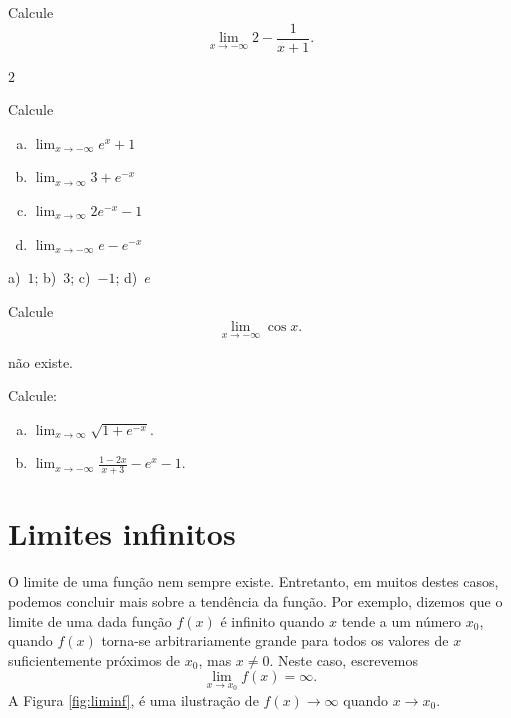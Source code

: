 \begin{exer}
  Calcule
  \begin{equation}
    \lim_{x\to -\infty} 2 - \frac{1}{x+1}.
  \end{equation}
\end{exer}
\begin{resp}
  $2$
\end{resp}

\begin{exer}
  Calcule
\end{exer}
\begin{enumerate}[a)]
\item $\displaystyle \lim_{x\to -\infty} e^x+1$
\item $\displaystyle \lim_{x\to \infty} 3 + e^{-x}$
\item $\displaystyle \lim_{x\to \infty} 2e^{-x}-1$
\item $\displaystyle \lim_{x\to -\infty} e-e^{-x}$
\end{enumerate}
\begin{resp}
  a)~$1$; b)~$3$; c)~$-1$; d)~$e$
\end{resp}

\begin{exer}
  Calcule
  \begin{equation}
    \lim_{x\to -\infty} \cos x.
  \end{equation}
\end{exer}
\begin{resp}
  não existe.
\end{resp}

\begin{exer}
  Calcule:
  \begin{enumerate}[a)]
  \item $\displaystyle\lim_{x\to \infty} \sqrt{1+e^{-x}}$.
  \item $\displaystyle\lim_{x\to -\infty} \frac{1-2x}{x+3} -e^{x} - 1$.
  \end{enumerate}
\end{exer}

\section{Limites infinitos}\label{cap_lim_sec_lim_inf}

O limite de uma função nem sempre existe. Entretanto, em muitos destes casos, podemos concluir mais sobre a tendência da função. Por exemplo, dizemos que o limite de uma dada função $f(x)$ é infinito quando $x$ tende a um número $x_0$, quando $f(x)$ torna-se arbitrariamente grande para todos os valores de $x$ suficientemente próximos de $x_0$, mas $x\neq 0$. Neste caso, escrevemos
\begin{equation}
  \lim_{x\to x_0} f(x) = \infty.
\end{equation}
A Figura \ref{fig:liminf}, é uma ilustração de $f(x)\to\infty$ quando $x\to x_0$.

